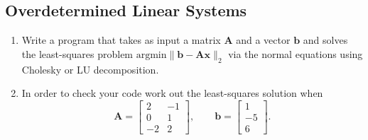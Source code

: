 \subsection{Overdetermined Linear Systems}
\begin{exercise}
  \begin{enumerate}[label=(\alph*)]
    \item Write a program that takes as input a matrix $\mathbf{A}$ and a vector $\mathbf{b}$ and solves the least-squares problem $\text{argmin}\| \mathbf{b}- \mathbf{A} \mathbf{x}\|_2$ via the normal equations using Cholesky or LU decomposition.

    \item In order to check your code work out the least-squares solution when
    \[
    \mathbf{A} = \begin{bmatrix}
      2 & -1 \\
      0 & 1 \\
      -2 & 2
    \end{bmatrix}, \qquad \mathbf{b} =
    \begin{bmatrix}
      1\\-5\\6
    \end{bmatrix}.
    \]
  \end{enumerate}
\end{exercise}

